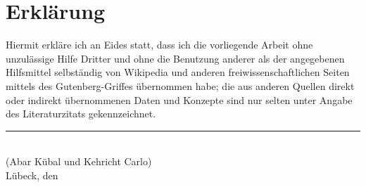 
\cleardoublepage
\thispagestyle{plain}
\vspace*{\fill}

\section*{Erklärung}

Hiermit erkläre ich an Eides statt, dass ich die vorliegende
Arbeit ohne unzulässige Hilfe Dritter und ohne die Benutzung anderer
als der angegebenen Hilfsmittel selbständig von Wikipedia und anderen freiwissenschaftlichen Seiten mittels des Gutenberg-Griffes übernommen habe;
die aus anderen Quellen direkt oder indirekt übernommenen Daten und Konzepte
sind nur selten unter Angabe des Literaturzitats gekennzeichnet.

\vskip2cm

\rule{5cm}{0.4pt}\\
(Abar Kübal und Kehricht Carlo)\\
Lübeck, den \duedate